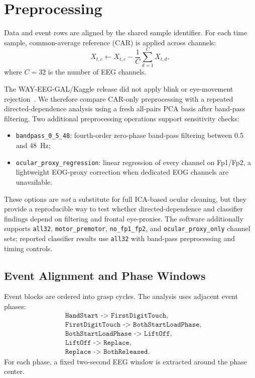 \documentclass[10pt,journal]{IEEEtran}
\newcommand{\code}[1]{\texttt{#1}}
\begin{document}
\section{Preprocessing}
Data and event rows are aligned by the shared sample identifier. For each time sample, common-average reference (CAR) is applied across channels:
\begin{equation}
    X_{t,c} \leftarrow X_{t,c} - \frac{1}{C}\sum_{d=1}^{C}X_{t,d},
\end{equation}
where $C=32$ is the number of EEG channels.

The WAY-EEG-GAL/Kaggle release did not apply blink or eye-movement rejection~\cite{luciw2014wayeeggal,kagglegrasp}. We therefore compare CAR-only preprocessing with a repeated directed-dependence analysis using a fresh all-pairs PCA basis after band-pass filtering. Two additional preprocessing operations support sensitivity checks:
\begin{itemize}
    \item \code{bandpass\_0\_5\_48}: fourth-order zero-phase band-pass filtering between 0.5 and 48~Hz;
    \item \code{ocular\_proxy\_regression}: linear regression of every channel on Fp1/Fp2, a lightweight EOG-proxy correction when dedicated EOG channels are unavailable.
\end{itemize}
These options are \emph{not} a substitute for full ICA-based ocular cleaning, but they provide a reproducible way to test whether directed-dependence and classifier findings depend on filtering and frontal eye-proxies. The software additionally supports \code{all32}, \code{motor\_premotor}, \code{no\_fp1\_fp2}, and \code{ocular\_proxy\_only} channel sets; reported classifier results use \code{all32} with band-pass preprocessing and timing controls.

\subsection{Event Alignment and Phase Windows}
Event blocks are ordered into grasp cycles. The analysis uses adjacent event phases:
\begin{equation}
    \begin{split}
         & \code{HandStart -> FirstDigitTouch},          \\
         & \code{FirstDigitTouch -> BothStartLoadPhase}, \\
         & \code{BothStartLoadPhase -> LiftOff},         \\
         & \code{LiftOff -> Replace},                    \\
         & \code{Replace -> BothReleased}.
    \end{split}
\end{equation}
For each phase, a fixed two-second EEG window is extracted around the phase center.
\end{document}
